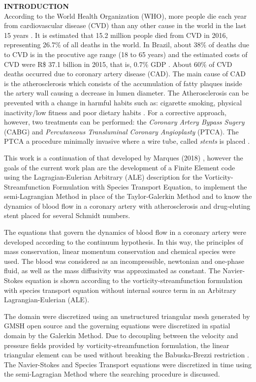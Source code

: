 \noindent\textbf{INTRODUCTION}
\\

According to the World Health Organization (WHO), more people die each year from cardiovascular disease (CVD) than any other cause in the world in the last 15 years \cite{oms2018}.
It is estimated that 15.2 million people died from CVD in 2016,
representing 26.7\% of all deaths in the world. 
In Brazil, about 38\% of deaths due to CVD is in the procutive age range
(18 to 65 years) and the estimated
costs of CVD were R\$ 37.1 billion
in 2015, that is, 0.7\% GDP \cite{siqueira2017}.
About 60\% of CVD deaths
occurred due to coronary artery disease (CAD).
The main cause of CAD is the atherosclerosis which consists of
the accumulation of fatty plaques inside the artery wall causing
a decrease in lumen diameter.
The Atherosclerosis can be prevented with a change in harmful habits
such as: cigarette smoking, physical inactivity/low fitness and poor dietary habits \cite{spring2013}.
For a corrective approach, however, two treatments can be performed:
the \textit{Coronary Artery Bypass Sugery} (CABG) and
\textit{Percutaneous Transluminal Coronary Angioplasty} (PTCA).
The PTCA a procedure minimally invasive where a wire tube,
called \textit{stents} is placed \cite{sigwart1987}.

\medskip
This work is a continuation of that developed by Marques (2018)
\cite{bsc2018}, however
the goals of the current work plan are the development of a
Finite Element code using the Lagragian-Eulerian Arbitrary (ALE) 
description for the Vorticity-Streamfunction Formulation 
with Species Transport Equation, to implement the semi-Lagrangian Method
in place of the Taylor-Galerkin Method and
to know the dynamics of blood flow in a 
coronary artery with atherosclerosis and drug-eluting stent placed
for several Schmidt numbers.

\medskip
The equations that govern the dynamics of blood flow in a coronary artery were developed according to the continuum hypothesis.
In this way, the principles of mass conservation, linear momentum conservation and chemical species were used.
The blood was considered as an incompressible, newtonian and one-phase 
fluid, as well as the mass diffusivity was approximated as constant.
The Navier-Stokes equation is shown according to the 
vorticity-streamfunction formulation with species transport 
equation without internal source term in an 
Arbitrary Lagrangian-Eulerian (ALE).

\medskip
The domain were discretized using an unstructured triangular 
mesh generated by GMSH open source \cite{gmsh} and 
the governing equations were discretized in spatial domain 
by the Galerkin Method. 
Due to decoupling between the velocity and pressure fields 
provided by vorticity-streamfunction formulation, the linear 
triangular element can be used without breaking the 
Babuska-Brezzi restriction \cite{babuska1971}\cite{brezzi1974}.
The Navier-Stokes and Species Transport equations were 
discretized in time using the semi-Lagragian Method 
\cite{pironneau1982} where the searching procedure is
discussed.

